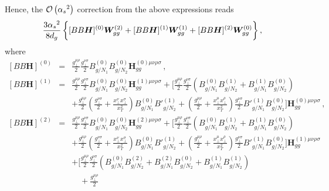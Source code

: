 \documentclass[a4paper,11pt]{report}
\numberwithin{equation}{section}
\newcommand{\bfH}{\bm{H}}
\begin{document}
Hence, the ${{\cal O}\left({\alpha_s}^2\right)}$ correction from the above expressions reads
\begin{equation}
  \frac{3\as^2}{8d_g}\,
  \bigg\{
  [BB\bfH]^{(0)}\bm{W}^{(2)}_{gg} + [BB\bfH]^{(1)}\bm{W}^{(1)}_{gg} +
  [BB\bfH]^{(2)}\bm{W}^{(0)}_{gg}
  \bigg\}\,,
\end{equation}
%
where
%
\begin{eqnarray}
  {[BB\bfH]}^{(0)} & = &
  \frac{g_\perp^{\mu\rho}}{2} \frac{g_\perp^{\nu\sigma}}{2}
  B_{g/N_1}^{(0)} B_{g/N_2}^{(0)}
  \bm{H}^{(0) \mu\nu\rho\sigma}_{gg}\,,
  \\
  {[BB\bfH]}^{(1)} & = &
  \frac{ g_\perp^{\mu\rho}}{2} \frac{g_\perp^{\nu\sigma}}{2} 
  B_{g/N_1}^{(0)} B_{g/N_2}^{(0)}
  \bm{H}^{(1) \mu\nu\rho\sigma}_{gg}
  +
  \Bigg[
  \frac{ g_\perp^{\mu\rho}}{2}
  \frac{g_\perp^{\nu\sigma}}{2} 
  \left(
  B_{g/N_1}^{(0)}B_{g/N_2}^{(1)} + B_{g/N_1}^{(1)}B_{g/N_2}^{(0)}
  \right) 
  \label{eq:BBH1}
  \\
  & & +
  \frac{ g_\perp^{\mu\rho}}{2}
  \left(\frac{g_\perp^{\nu\sigma}}{2}+
        \frac{x_\perp^\nu x_\perp^\sigma}{x_T^2}\right)
  B_{g/N_1}^{(0)} {B'}_{g/N_2}^{(1)}
  +
  \left(\frac{g_\perp^{\mu\rho}}{2}+
  \frac{x_\perp^\mu x_\perp^\rho}{x_T^2}\right) 
  \frac{g_\perp^{\nu\sigma}}{2} 
  {B'}_{g/N_1}^{(1)} B_{g/N_2}^{(0)} 
  \Bigg]
  \bm{H}^{(0) \mu\nu\rho\sigma}_{gg}\,,
  \nonumber
  \\
  {[BB\bfH]}^{(2)} & = &
  \frac{ g_\perp^{\mu\rho}}{2}
  \frac{g_\perp^{\nu\sigma}}{2} B_{g/N_1}^{(0)} B_{g/N_2}^{(0)}
  \bm{H}^{(2) \mu\nu\rho\sigma}_{gg}
  +
  \Bigg[
  \frac{ g_\perp^{\mu\rho}}{2}
  \frac{g_\perp^{\nu\sigma}}{2} 
  \left(
  B_{g/N_1}^{(0)}B_{g/N_2}^{(1)} + B_{g/N_1}^{(1)}B_{g/N_2}^{(0)}
  \right) 
  \nonumber \\
  & & +
  \frac{ g_\perp^{\mu\rho}}{2}
  \left(\frac{g_\perp^{\nu\sigma}}{2}+
        \frac{x_\perp^\nu x_\perp^\sigma}{x_T^2}\right)
  B_{g/N_1}^{(0)} {B'}_{g/N_2}^{(1)}
  +
  \left(\frac{g_\perp^{\mu\rho}}{2}+
  \frac{x_\perp^\mu x_\perp^\rho}{x_T^2}\right) 
  \frac{g_\perp^{\nu\sigma}}{2} 
  {B'}_{g/N_1}^{(1)} B_{g/N_2}^{(0)} 
  \Bigg]
  \bm{H}^{(1) \mu\nu\rho\sigma}_{gg}
  \nonumber \\
  & & +
  \Bigg[
  \frac{ g_\perp^{\mu\rho}}{2}
  \frac{g_\perp^{\nu\sigma}}{2} 
  \left(
  B_{g/N_1}^{(0)}B_{g/N_2}^{(2)} + B_{g/N_1}^{(2)}B_{g/N_2}^{(0)} +
  B_{g/N_1}^{(1)}B_{g/N_2}^{(1)}
  \right)  
  \nonumber \\
  & & 
  \quad +
  \frac{ g_\perp^{\mu\rho}}{2}

\end{eqnarray}
\end{document}
